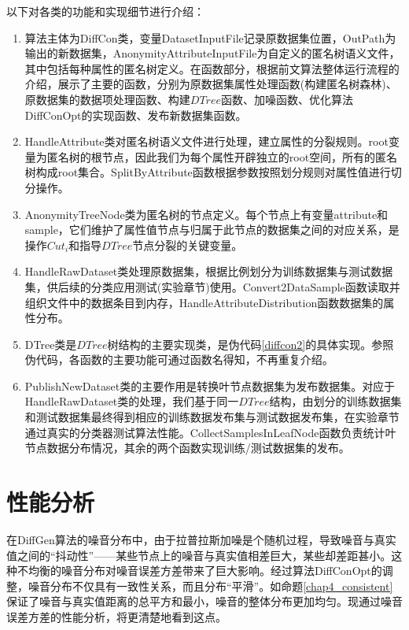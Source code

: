 以下对各类的功能和实现细节进行介绍：
\begin{enumerate}
	\item 算法主体为DiffCon类，变量DatasetInputFile记录原数据集位置，OutPath为输出的新数据集，AnonymityAttributeInputFile为自定义的匿名树语义文件，其中包括每种属性的匿名树定义。在函数部分，根据前文算法整体运行流程的介绍，展示了主要的函数，分别为原数据集属性处理函数(构建匿名树森林)、原数据集的数据项处理函数、构建$DTree$函数、加噪函数、优化算法DiffConOpt的实现函数、发布新数据集函数。
	\item HandleAttribute类对匿名树语义文件进行处理，建立属性的分裂规则。root变量为匿名树的根节点，因此我们为每个属性开辟独立的root空间，所有的匿名树构成root集合。SplitByAttribute函数根据参数按照划分规则对属性值进行切分操作。
	\item AnonymityTreeNode类为匿名树的节点定义。每个节点上有变量attribute和sample，它们维护了属性值节点与归属于此节点的数据集之间的对应关系，是操作$Cut_{i}$和指导$DTree$节点分裂的关键变量。
	\item HandleRawDataset类处理原数据集，根据比例划分为训练数据集与测试数据集，供后续的分类应用测试(实验章节)使用。Convert2DataSample函数读取并组织文件中的数据条目到内存，HandleAttributeDistribution函数数据集的属性分布。
	\item DTree类是$DTree$树结构的主要实现类，是伪代码\ref{diffcon2}的具体实现。参照伪代码，各函数的主要功能可通过函数名得知，不再重复介绍。
	\item PublishNewDataset类的主要作用是转换叶节点数据集为发布数据集。对应于HandleRawDataset类的处理，我们基于同一$DTree$结构，由划分的训练数据集和测试数据集最终得到相应的训练数据发布集与测试数据发布集，在实验章节通过真实的分类器测试算法性能。CollectSamplesInLeafNode函数负责统计叶节点数据分布情况，其余的两个函数实现训练/测试数据集的发布。
\end{enumerate}

\section{性能分析}
\label{theory analysis}

在DiffGen算法的噪音分布中，由于拉普拉斯加噪是个随机过程，导致噪音与真实值之间的“抖动性”——某些节点上的噪音与真实值相差巨大，某些却差距甚小。这种不均衡的噪音分布对噪音误差方差带来了巨大影响。经过算法DiffConOpt的调整，噪音分布不仅具有一致性关系，而且分布“平滑”。如命题\ref{chap4_consistent}保证了噪音与真实值距离的总平方和最小，噪音的整体分布更加均匀。现通过噪音误差方差的性能分析，将更清楚地看到这点。

